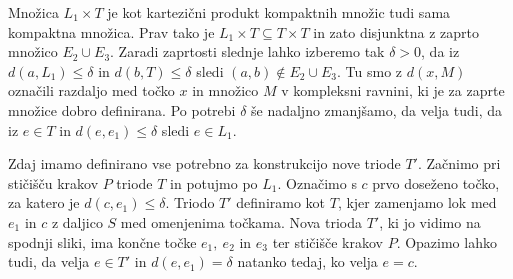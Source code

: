 \documentclass[mat1]{fmfdelo}
\begin{document}
Množica $L_1 \times T$ je kot kartezični produkt kompaktnih množic tudi sama kompaktna množica. Prav tako je $L_1 \times T \subseteq T \times T$ in zato disjunktna z zaprto množico $E_2 \cup E_3$. Zaradi zaprtosti slednje lahko izberemo tak $\delta > 0$, da iz $d(a, L_1)\leq \delta$ in $d(b, T)\leq \delta$ sledi $(a, b) \notin E_2 \cup E_3$. Tu smo z $d(x, M)$ označili razdaljo med točko $x$ in množico $M$ v kompleksni ravnini, ki je za zaprte množice dobro definirana. Po potrebi $\delta$ še nadaljno zmanjšamo, da velja tudi, da iz $e \in T$ in $d(e, e_1) \leq \delta$ sledi $e \in L_1$.

Zdaj imamo definirano vse potrebno za konstrukcijo nove triode $T'$. Začnimo pri stičišču krakov $P$ triode $T$ in potujmo po $L_1$. Označimo s $c$ prvo doseženo točko, za katero je $d(c, e_1) \leq \delta$. Triodo $T'$ definiramo kot $T$, kjer zamenjamo lok med $e_1$ in $c$ z daljico $S$ med omenjenima točkama. Nova trioda $T'$, ki jo vidimo na spodnji sliki, ima končne točke $e_1,\ e_2$ in $e_3$ ter stičišče krakov $P$. Opazimo lahko tudi, da velja $e \in T'$ in $d(e, e_1) = \delta$ natanko tedaj, ko velja $e=c$.

\begin{center}
\end{center}
\end{document}
